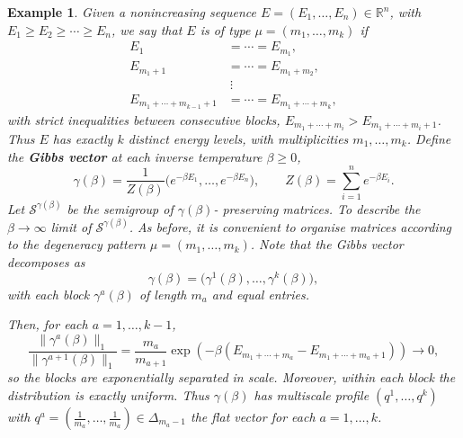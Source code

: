 \documentclass[11pt,a4paper,longbibliography]{amsart}
\numberwithin{equation}{section}
\theoremstyle{plain}
\newtheorem{ex}{Example}[section]
\theoremstyle{definition}
\theoremstyle{remark}
\begin{document}
	\begin{ex}
		Given a nonincreasing sequence $
		E=(E_1,\ldots,E_n)\in\mathbb R^n$, with $E_1\geq E_2\geq\cdots \geq E_n$,
		we say that $E$ is of type $\mu=(m_1,\ldots,m_k)$
		if
		\begin{equation}
			\begin{aligned}
				E_1&=\cdots=E_{m_1},\\
				E_{m_1+1}&=\cdots=E_{m_1+m_2},\\
				&\ \vdots\\
				E_{m_1+\cdots+m_{k-1}+1}
				&=\cdots=
				E_{m_1+\cdots+m_k},
			\end{aligned}
		\end{equation}
		with strict inequalities between consecutive blocks, $E_{m_1+\cdots+m_i} > E_{m_1+\cdots+m_i + 1}$. Thus $E$ has exactly $k$ distinct energy levels, with multiplicities $m_1,\ldots,m_k$. 
		Define the \textbf{Gibbs vector} at each inverse temperature $\beta\geq0$,
		\begin{equation}
			\label{eq:Gibbs}
			\gamma(\beta)
			=
			\frac1{Z(\beta)}
			\bigl(
			e^{-\beta E_1},
			\ldots,
			e^{-\beta E_n}
			\bigr),
			\qquad
			Z(\beta)=\sum_{i=1}^n e^{-\beta E_i}.
		\end{equation}
		Let $\mathcal{S}^{\gamma(\beta)}$
		be the semigroup of $\gamma(\beta)$- preserving matrices. 
		To describe the $\beta\to\infty$ limit of $\mathcal{S}^{\gamma(\beta)}$. 
		As before, it is convenient to organise matrices according to the degeneracy pattern $
		\mu=(m_1,\ldots,m_k)$.
		Note that the Gibbs vector decomposes as
		$$
		\gamma(\beta)
		=
		\bigl(
		\gamma^1(\beta),
		\ldots,
		\gamma^k(\beta)
		\bigr),
		$$
		with each block $\gamma^a(\beta)$ of length $m_a$ and equal entries.
		
		Then, for each $a=1,\ldots, k-1$,
		\begin{equation}
			\frac{\|\gamma^a(\beta)\|_1}
			{\|\gamma^{a+1}(\beta)\|_1}=\frac{m_a}{m_{a+1}} \exp\left(-\beta \left(E_{m_1+\cdots+{m_a}}-E_{m_1+\cdots+{m_a}+1}\right)\right)\to 0, 
		\end{equation}
		so the blocks are exponentially separated in scale. Moreover, within each block the distribution is exactly uniform. Thus  $\gamma(\beta)$ has multiscale profile $(q^1,\ldots, q^k)$ with $q^a=\left(\frac{1}{m_a},\ldots,\frac{1}{m_a}\right)\in\Delta_{m_a-1}$ the flat vector for each $a=1,\ldots,k$.
		

\end{ex}
\end{document}

